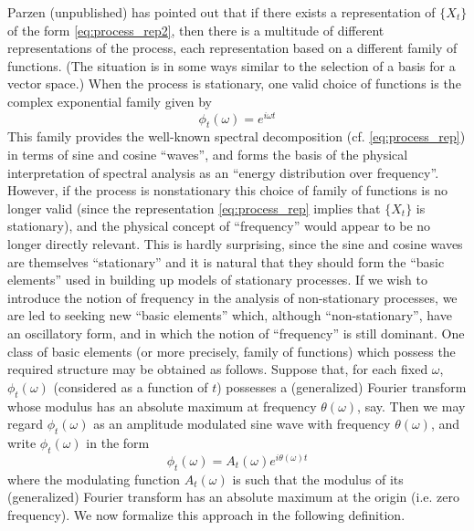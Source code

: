 \documentclass{article}
\begin{document}
Parzen (unpublished) has pointed out that if there exists a representation of
$\{X_t \}$ of the form \eqref{eq:process_rep2}, then there is a multitude of
different representations of the process, each representation based on a
different family of functions. (The situation is in some ways similar to the
selection of a basis for a vector space.) When the process is stationary, one
valid choice of functions is the complex exponential family given by
\begin{equation}
  \label{eq:complex_exp} \phi_t (\omega) = e^{i \omega t}
\end{equation}
This family provides the well-known spectral decomposition (cf.
\eqref{eq:process_rep}) in terms of sine and cosine ``waves'', and forms the
basis of the physical interpretation of spectral analysis as an ``energy
distribution over frequency''. However, if the process is nonstationary this
choice of family of functions is no longer valid (since the representation
\eqref{eq:process_rep} implies that $\{X_t \}$ is stationary), and the
physical concept of ``frequency'' would appear to be no longer directly
relevant. This is hardly surprising, since the sine and cosine waves are
themselves ``stationary'' and it is natural that they should form the ``basic
elements'' used in building up models of stationary processes. If we wish to
introduce the notion of frequency in the analysis of non-stationary processes,
we are led to seeking new ``basic elements'' which, although
``non-stationary'', have an oscillatory form, and in which the notion of
``frequency'' is still dominant. One class of basic elements (or more
precisely, family of functions) which possess the required structure may be
obtained as follows. Suppose that, for each fixed $\omega$, $\phi_t (\omega)$
(considered as a function of $t$) possesses a (generalized) Fourier transform
whose modulus has an absolute maximum at frequency $\theta (\omega)$, say.
Then we may regard $\phi_t (\omega)$ as an amplitude modulated sine wave with
frequency $\theta (\omega)$, and write $\phi_t (\omega)$ in the form
\begin{equation}
  \label{eq:amplitude_modulated} \phi_t (\omega) = A_t (\omega) e^{i \theta
  (\omega) t}
\end{equation}
where the modulating function $A_t (\omega)$ is such that the modulus of its
(generalized) Fourier transform has an absolute maximum at the origin (i.e.
zero frequency). We now formalize this approach in the following definition.
\end{document}

